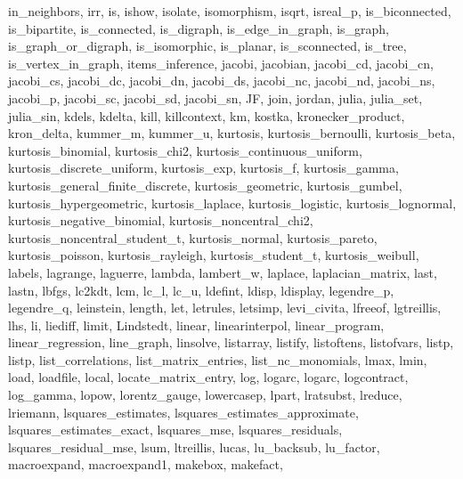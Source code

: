 {{    in_neighbors,
    irr,
    is,
    ishow,
    isolate,
    isomorphism,
    isqrt,
    isreal_p,
    is_biconnected,
    is_bipartite,
    is_connected,
    is_digraph,
    is_edge_in_graph,
    is_graph,
    is_graph_or_digraph,
    is_isomorphic,
    is_planar,
    is_sconnected,
    is_tree,
    is_vertex_in_graph,
    items_inference,
    jacobi,
    jacobian,
    jacobi_cd,
    jacobi_cn,
    jacobi_cs,
    jacobi_dc,
    jacobi_dn,
    jacobi_ds,
    jacobi_nc,
    jacobi_nd,
    jacobi_ns,
    jacobi_p,
    jacobi_sc,
    jacobi_sd,
    jacobi_sn,
    JF,
    join,
    jordan,
    julia,
    julia_set,
    julia_sin,
    kdels,
    kdelta,
    kill,
    killcontext,
    km,
    kostka,
    kronecker_product,
    kron_delta,
    kummer_m,
    kummer_u,
    kurtosis,
    kurtosis_bernoulli,
    kurtosis_beta,
    kurtosis_binomial,
    kurtosis_chi2,
    kurtosis_continuous_uniform,
    kurtosis_discrete_uniform,
    kurtosis_exp,
    kurtosis_f,
    kurtosis_gamma,
    kurtosis_general_finite_discrete,
    kurtosis_geometric,
    kurtosis_gumbel,
    kurtosis_hypergeometric,
    kurtosis_laplace,
    kurtosis_logistic,
    kurtosis_lognormal,
    kurtosis_negative_binomial,
    kurtosis_noncentral_chi2,
    kurtosis_noncentral_student_t,
    kurtosis_normal,
    kurtosis_pareto,
    kurtosis_poisson,
    kurtosis_rayleigh,
    kurtosis_student_t,
    kurtosis_weibull,
    labels,
    lagrange,
    laguerre,
    lambda,
    lambert_w,
    laplace,
    laplacian_matrix,
    last,
    lastn,
    lbfgs,
    lc2kdt,
    lcm,
    lc_l,
    lc_u,
    ldefint,
    ldisp,
    ldisplay,
    legendre_p,
    legendre_q,
    leinstein,
    length,
    let,
    letrules,
    letsimp,
    levi_civita,
    lfreeof,
    lgtreillis,
    lhs,
    li,
    liediff,
    limit,
    Lindstedt,
    linear,
    linearinterpol,
    linear_program,
    linear_regression,
    line_graph,
    linsolve,
    listarray,
    listify,
    listoftens,
    listofvars,
    listp,
    listp,
    list_correlations,
    list_matrix_entries,
    list_nc_monomials,
    lmax,
    lmin,
    load,
    loadfile,
    local,
    locate_matrix_entry,
    log,
    logarc,
    logarc,
    logcontract,
    log_gamma,
    lopow,
    lorentz_gauge,
    lowercasep,
    lpart,
    lratsubst,
    lreduce,
    lriemann,
    lsquares_estimates,
    lsquares_estimates_approximate,
    lsquares_estimates_exact,
    lsquares_mse,
    lsquares_residuals,
    lsquares_residual_mse,
    lsum,
    ltreillis,
    lucas,
    lu_backsub,
    lu_factor,
    macroexpand,
    macroexpand1,
    makebox,
    makefact,
}}
